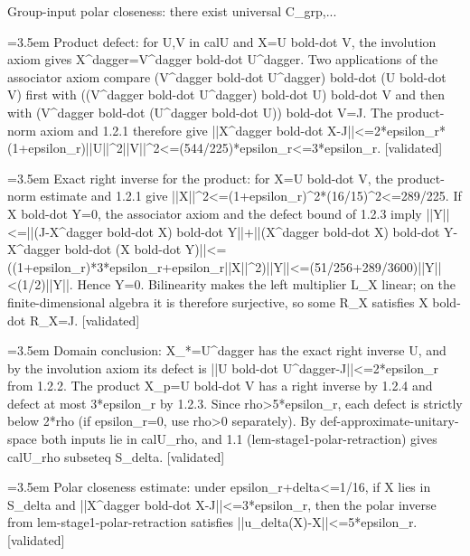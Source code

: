 \documentclass{article}
\newcommand{\step}[1]{\par\noindent\hangindent=3.5em\hangafter=1%
  \makebox[3.5em][l]{\textbf{#1.}}}
\newcommand{\steptag}[1]{\hfill{\small\textsf{[#1]}}}
\begin{document}
\begin{proofbox}{Group-input polar closeness: there exist universal C\_grp,...}
\step{1.2.3} Product defect: for U,V in calU and X=U bold-dot V, the involution axiom gives X\textasciicircum{}dagger=V\textasciicircum{}dagger bold-dot U\textasciicircum{}dagger. Two applications of the associator axiom compare (V\textasciicircum{}dagger bold-dot U\textasciicircum{}dagger) bold-dot (U bold-dot V) first with ((V\textasciicircum{}dagger bold-dot U\textasciicircum{}dagger) bold-dot U) bold-dot V and then with (V\textasciicircum{}dagger bold-dot (U\textasciicircum{}dagger bold-dot U)) bold-dot V=J. The product-norm axiom and 1.2.1 therefore give ||X\textasciicircum{}dagger bold-dot X-J||<=2*epsilon\_r*(1+epsilon\_r)||U||\textasciicircum{}2||V||\textasciicircum{}2<=(544/225)*epsilon\_r<=3*epsilon\_r. \steptag{validated} \\[4pt]
\step{1.2.4} Exact right inverse for the product: for X=U bold-dot V, the product-norm estimate and 1.2.1 give ||X||\textasciicircum{}2<=(1+epsilon\_r)\textasciicircum{}2*(16/15)\textasciicircum{}2<=289/225. If X bold-dot Y=0, the associator axiom and the defect bound of 1.2.3 imply ||Y||<=||(J-X\textasciicircum{}dagger bold-dot X) bold-dot Y||+||(X\textasciicircum{}dagger bold-dot X) bold-dot Y-X\textasciicircum{}dagger bold-dot (X bold-dot Y)||<=((1+epsilon\_r)*3*epsilon\_r+epsilon\_r||X||\textasciicircum{}2)||Y||<=(51/256+289/3600)||Y||<(1/2)||Y||. Hence Y=0. Bilinearity makes the left multiplier L\_X linear; on the finite-dimensional algebra it is therefore surjective, so some R\_X satisfies X bold-dot R\_X=J. \steptag{validated} \\[4pt]
\step{1.2.5} Domain conclusion: X\_*=U\textasciicircum{}dagger has the exact right inverse U, and by the involution axiom its defect is ||U bold-dot U\textasciicircum{}dagger-J||<=2*epsilon\_r from 1.2.2. The product X\_p=U bold-dot V has a right inverse by 1.2.4 and defect at most 3*epsilon\_r by 1.2.3. Since rho>5*epsilon\_r, each defect is strictly below 2*rho (if epsilon\_r=0, use rho>0 separately). By def-approximate-unitary-space both inputs lie in calU\_rho, and 1.1 (lem-stage1-polar-retraction) gives calU\_rho subseteq S\_delta. \steptag{validated} \\[4pt]
\step{1.3} Polar closeness estimate: under epsilon\_r+delta<=1/16, if X lies in S\_delta and ||X\textasciicircum{}dagger bold-dot X-J||<=3*epsilon\_r, then the polar inverse from lem-stage1-polar-retraction satisfies ||u\_delta(X)-X||<=5*epsilon\_r. \steptag{validated} \\[6pt]

\end{proofbox}
\end{document}
